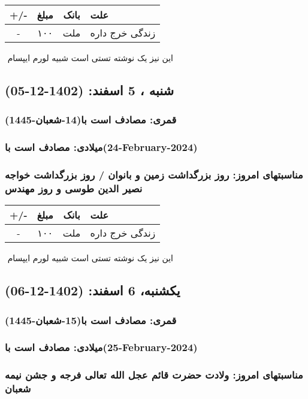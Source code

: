 \documentclass{article}
\newcommand{\rnote}[1]{\marginpar{\textcolor{color}{\StrSubstitute{\##1}{ }{\_}}}}
\newcommand{\myRow}[4]{
    #1 & #2 & #3 & #4 \\ \hline
}
\begin{document}
\begin{tabular}{ | c | c | c | p{5cm} |}
    \hline
    \myRow{ +/- }{مبلغ}{بانک}{علت}
    \myRow{-}{۱۰۰}{ملت}{زندگی خرج داره}
\end{tabular}
\newline
\newline

‌
\rnote{تست}
این نیز یک نوشته تستی است شبیه لورم ایپسام




\newpage
{}
\textcolor{color}{
\section{ شنبه ، 5 اسفند: (1402-12-05) }
\subsubsection*{قمری: مصادف است با(14-شعبان-1445)} 
\subsubsection*{میلادی: مصادف است با(24-February-2024)}
\subsubsection*{مناسبتهای امروز: روز بزرگداشت زمین و بانوان / روز بزرگداشت خواجه نصیر الدین طوسی و روز مهندس}
}


\begin{tabular}{ | c | c | c | p{5cm} |}
    \hline
    \myRow{ +/- }{مبلغ}{بانک}{علت}
    \myRow{-}{۱۰۰}{ملت}{زندگی خرج داره}
\end{tabular}
\newline
\newline

‌
\rnote{تست}
این نیز یک نوشته تستی است شبیه لورم ایپسام




\newpage
{}
\textcolor{color}{
\section{ یکشنبه، 6 اسفند: (1402-12-06) }
\subsubsection*{قمری: مصادف است با(15-شعبان-1445)} 
\subsubsection*{میلادی: مصادف است با(25-February-2024)}
\subsubsection*{مناسبتهای امروز: ولادت حضرت قائم عجل الله تعالی فرجه و جشن نیمه شعبان}
}
\end{document}
